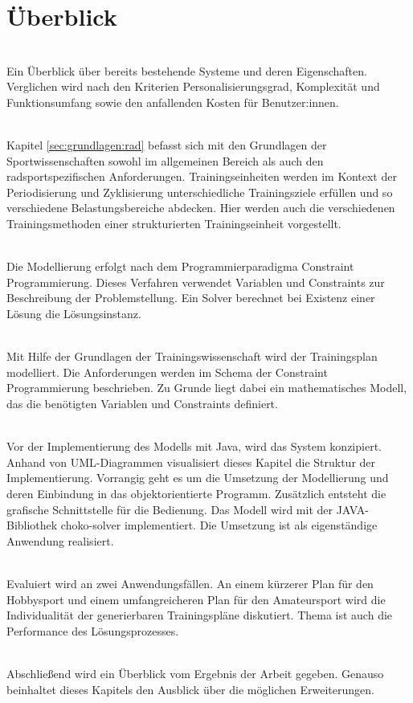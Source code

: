 \section{Überblick}
\label{sec:intro:ueberblick}
\textbf{} \\[0.2em]
Ein Überblick über bereits bestehende Systeme und deren Eigenschaften. Verglichen wird nach den Kriterien Personalisierungsgrad, Komplexität und Funktionsumfang sowie den anfallenden Kosten für Benutzer:innen.

\textbf{} \\[0.2em]
Kapitel \ref{sec:grundlagen:rad} befasst sich mit den Grundlagen der Sportwissenschaften sowohl im allgemeinen Bereich als auch den radsportspezifischen Anforderungen. Trainingseinheiten werden im Kontext der Periodisierung und Zyklisierung unterschiedliche Trainingsziele erfüllen und so verschiedene Belastungsbereiche abdecken. Hier werden auch die verschiedenen Trainingsmethoden einer strukturierten Trainingseinheit vorgestellt.

\textbf{} \\[0.2em]
Die Modellierung erfolgt nach dem Programmierparadigma Constraint Programmierung. Dieses Verfahren verwendet Variablen und Constraints zur Beschreibung der Problemstellung. Ein Solver berechnet bei Existenz einer Lösung die Lösungsinstanz. 

\textbf{} \\[0.2em]
Mit Hilfe der Grundlagen der Trainingswissenschaft wird der Trainingsplan modelliert. Die Anforderungen werden im Schema der Constraint Programmierung beschrieben. Zu Grunde liegt dabei ein mathematisches Modell, das die benötigten Variablen und Constraints definiert.

\textbf{} \\[0.2em]
Vor der Implementierung des Modells mit Java, wird das System konzipiert. Anhand von UML-Diagrammen visualisiert dieses Kapitel die Struktur der Implementierung. Vorrangig geht es um die Umsetzung der Modellierung und deren Einbindung in das objektorientierte Programm. Zusätzlich entsteht die grafische Schnittstelle für die Bedienung. Das Modell wird mit der JAVA-Bibliothek choko-solver implementiert. Die Umsetzung ist als eigenständige Anwendung realisiert. 

\textbf{} \\[0.2em]
Evaluiert wird an zwei Anwendungsfällen. An einem kürzerer Plan für den Hobbysport und einem umfangreicheren Plan für den Amateursport wird die Individualität der generierbaren Trainingspläne diskutiert. Thema ist auch die Performance des Lösungsprozesses.

\textbf{} \\[0.2em]
Abschließend wird ein Überblick vom Ergebnis der Arbeit gegeben. Genauso beinhaltet dieses Kapitels den Ausblick über die möglichen Erweiterungen.
